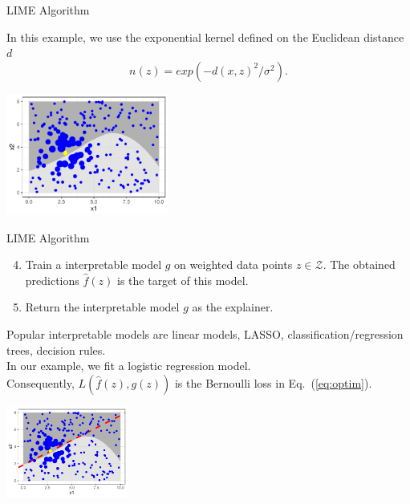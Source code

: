 \documentclass[aspectratio=169]{../latex_main/tntbeamer}  %
\begin{document}
\begin{frame}{LIME Algorithm }

		In this example, we use the exponential kernel defined on the Euclidean distance $d$
		 $$n(z) = exp(-d(x, z)^2/\sigma^2).$$ 
		\begin{center}
			\includegraphics[width=0.4\textwidth]{figure/lime4}
		\end{center}
		

\end{frame}
\begin{frame}{LIME Algorithm }
		\begin{enumerate}
			\setcounter{enumi}{3}
		\item Train a interpretable model $g$ on weighted data points $z \in \mathcal{Z}$. The obtained predictions $\hat{f}(z)$ is the target of this model.
		\item Return the interpretable model $g$ as the explainer. \\[0.3cm]
			\end{enumerate}
		Popular interpretable models are linear models, LASSO, classification/regression trees, decision rules. \\
		In our example, we fit a logistic regression model. \\Consequently, $L(\hat{f}(z), g(z))$  is the Bernoulli loss in Eq.~(\ref{eq:optim}). 
		\begin{center}
			\includegraphics[width=0.3\textwidth]{figure/lime5}
		\end{center}
\end{frame}
\end{document}
